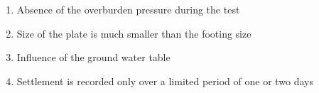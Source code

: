 \begin{enumerate}
    \item Absence of the overburden pressure during the test
    \item Size of the plate is much smaller than the footing size
    \item Influence of the ground water table
    \item Settlement is recorded only over a limited period of one or two days
\end{enumerate}

